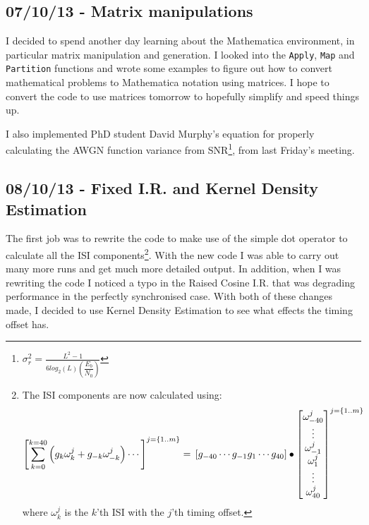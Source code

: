 \subsection{07/10/13 - Matrix manipulations}

I decided to spend another day learning about the Mathematica
environment, in particular matrix manipulation and generation. I looked
into the \texttt{Apply}, \texttt{Map} and \texttt{Partition} functions
and wrote some examples to figure out how to convert mathematical
problems to Mathematica notation using matrices. I hope to convert the
code to use matrices tomorrow to hopefully simplify and speed things up.

I also implemented PhD student David Murphy's equation for properly calculating the AWGN
function variance from SNR\footnote{$\sigma_r^2 = \frac{L^2 - 1}{6 log_2(L) \left ( \dfrac{E_b}{N_0} \right )}$}, from last Friday's meeting.

\subsection{08/10/13 - Fixed I.R. and Kernel Density Estimation}

The first job was to rewrite the code to make use of the simple dot
operator to calculate all the ISI components\footnote{The ISI components
  are now calculated using: \[
  \left [
    \sum_{k=0}^{k=40} \left ( g_k \omega_k^j + g_{-k} \omega_{-k}^j \right ) \cdots
  \right ]^{j=\{1..m\}} = \\
\left [ 
    g_{-40} \cdots g_{-1} g_{1} \cdots g_{40}
  \right ] \bullet \left [
    \begin{matrix}
  \omega_{-40}^j  \\
  \vdots          \\
  \omega_{-1}^j   \\
  \omega_{1}^j     \\
  \vdots            \\
  \omega_{40}^j    \\
    \end{matrix}
  \right ]^{j=\{1..m\}}
  \] where $\omega_{k}^j$ is the $k$'th ISI with the $j$'th timing
  offset.}. With the new code I was able to carry out many more runs and
get much more detailed output. In addition, when I was rewriting the
code I noticed a typo in the Raised Cosine I.R. that was degrading
performance in the perfectly synchronised case. With both of these
changes made, I decided to use Kernel Density Estimation to see what
effects the timing offset has.

